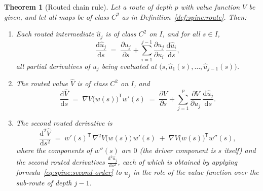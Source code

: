 \documentclass[11pt]{book}
\theoremstyle{plain}
\newtheorem{theorem}{Theorem}[chapter]
\theoremstyle{definition}
\theoremstyle{remark}
\newcommand{\dd}{\mathrm{d}}                                  %
\newcommand{\pd}[2]{\frac{\partial #1}{\partial #2}}          %
\newcommand{\td}[2]{\frac{\dd #1}{\dd #2}}                    %
\begin{document}
\begin{theorem}[Routed chain rule]\label{thm:spine:routed-chain}
Let a route of depth $p$ with value function $V$ be given, and let all maps be
of class $C^2$ as in Definition~\ref{def:spine:route}. Then:
\begin{enumerate}
  \item[(i)] Each routed intermediate $\hat u_j$ is of class $C^2$ on $I$, and
    for all $s \in I$,
    \begin{equation}\label{eq:spine:link-recursion}
      \td{\hat u_j}{s}
      \;=\; \pd{u_j}{s} + \sum_{i=1}^{j-1} \pd{u_j}{u_i}\,\td{\hat u_i}{s},
    \end{equation}
    all partial derivatives of $u_j$ being evaluated at
    $\bigl(s, \hat u_1(s), \ldots, \hat u_{j-1}(s)\bigr)$.
  \item[(ii)] The routed value $\hat V$ is of class $C^2$ on $I$, and
    \begin{equation}\label{eq:spine:first-order}
      \td{\hat V}{s}
      \;=\; \nabla V\bigl(w(s)\bigr)^{\mathsf T} w'(s)
      \;=\; \pd{V}{s} + \sum_{j=1}^{p} \pd{V}{u_j}\,\td{\hat u_j}{s}.
    \end{equation}
  \item[(iii)] The second routed derivative is
    \begin{equation}\label{eq:spine:second-order}
      \frac{\dd^2 \hat V}{\dd s^2}
      \;=\; w'(s)^{\mathsf T}\, \nabla^2 V\bigl(w(s)\bigr)\, w'(s)
        \;+\; \nabla V\bigl(w(s)\bigr)^{\mathsf T} w''(s),
    \end{equation}
    where the components of $w''(s)$ are $0$ (the driver component is $s$
    itself) and the second routed derivatives
    $\frac{\dd^2 \hat u_j}{\dd s^2}$, each of which is obtained by applying
    formula~\eqref{eq:spine:second-order} to $u_j$ in the role of the value
    function over the sub-route of depth $j-1$.
\end{enumerate}
\end{theorem}
\end{document}
